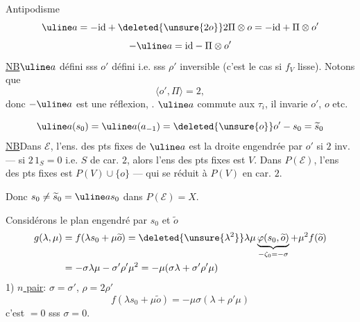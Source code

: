 Antipodisme
\[
\uline a=-\mathrm{id}+\deleted{\unsure{2o}}
2\Pi\otimes o=-\mathrm{id}+\Pi\otimes o'
\]
\[
-\uline a=\mathrm{id}-\Pi\otimes o'
\]
\uline{NB}\quad$\uline a$ défini sss $o'$ défini i.e. sss $\rho'$ inversible
(c'est le cas si $f_V$ lisse). Notons que
\[
\langle o',\Pi\rangle=2,
\]
donc $-\uline a$ est une réflexion,
.
$\uline a$ commute aux $\tau_i$, il invarie $o'$, $o$ etc.

\[
\uline a(s_0)=\uline a(a_{-1})
=\deleted{\unsure{o}}o'-s_0=\widetilde s_0
\]
\uline{NB}\quad Dans $\mathcal E$, l'ens. des pts fixes de $\uline a$ est
la droite engendrée par $o'$ si $2$ inv.
--- si $2\,1_S=0$ i.e. $S$ de car. $2$, alors l'ens des pts fixes est $V$.
Dans $P(\mathcal E)$, l'ens des pts fixes est $P(V)\cup\{o\}$
--- qui se réduit à $P(V)$ en car. $2$.

Donc $s_0\neq\widetilde s_0=\uline a s_0$ dans $P(\mathcal E)=X$.

Considérons le  plan engendré par $s_0$ et $\widetilde o$
\[
\begin{aligned}
g(\lambda,\mu)&=f(\lambda s_0+\mu\widetilde o)
=\deleted{\unsure{\lambda^2}}
\lambda\mu\underbrace{\varphi(s_0,\widetilde o)}_{-\zeta_0=-\sigma}
+\mu^2f(\widetilde o)\\
&=-\sigma\lambda\mu-\sigma'\rho'\mu^2
=-\mu(\sigma\lambda+\sigma'\rho'\mu)
\end{aligned}
\]
1) \uline{$n$ pair}: $\sigma=\sigma'$, $\rho=2\rho'$
\[
f(\lambda s_0+\mu\widetilde o)=-\mu\sigma(\lambda+\rho'\mu)
\]
c'est $=0$ sss $\sigma=0$.


